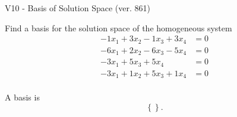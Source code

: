 \begin{exercise}
  \begin{exerciseTitle}V10 - Basis of Solution Space (ver. 861)\end{exerciseTitle}
  \begin{exerciseStatement}
    Find a basis for the solution space of the homogeneous system 
\begin{align*}
 -1 x_ 1 + 3 x_ 2 -1 x_ 3 + 3 x_ 4 &= 0  \\ 
  -6 x_ 1 + 2 x_ 2 -6 x_ 3 -5 x_ 4 &= 0  \\ 
  -3 x_ 1 + 5 x_ 3 + 5 x_ 4 &= 0  \\ 
  -3 x_ 1 + 1 x_ 2 + 5 x_ 3 + 1 x_ 4 &= 0  \\ 
 \end{align*}


 
  \end{exerciseStatement}

  \begin{exerciseAnswer}
   A basis is   
\[\left\{\right\}.\]

  


  \end{exerciseAnswer}
\end{exercise}